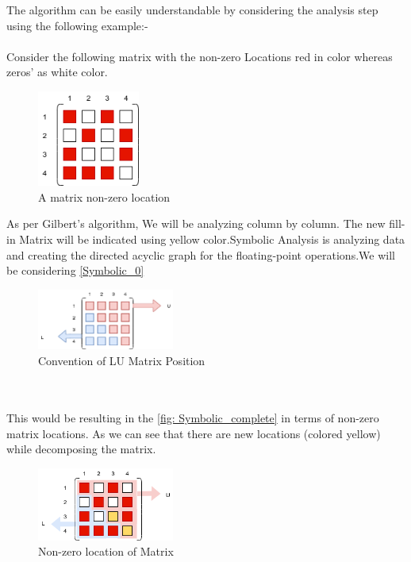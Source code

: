 The algorithm can be easily understandable by considering the analysis step using the following example:-\\\\
Consider the following matrix with the non-zero Locations red in color whereas zeros' as white color.\\
\begin{figure}[H]
    \centering
    \includegraphics[width = 0.30\textwidth]{./Scheduler/PpT-Symbolic_1.png}
    \caption{A matrix non-zero location}
    \label{fig:Symbolic_1}
\end{figure}

As per Gilbert's algorithm, We will be analyzing column by column. The new fill-in Matrix will be indicated using yellow color.Symbolic Analysis is analyzing data and creating the directed acyclic graph for the floating-point operations.We will be considering \ref{Symbolic_0}

\begin{figure}[H]
    \centering
    \includegraphics[width = 0.40\textwidth]{./Scheduler/PpT-Symbolic_0.png}
    \caption{Convention of LU Matrix Position}
    \label{fig:Symbolic_0}
\end{figure}



\\
\\
This would be resulting in the \ref{fig: Symbolic_complete} in terms of non-zero matrix locations. As we can see that there are new locations (colored yellow) while decomposing the matrix.

\begin{figure}[H]
    \centering
    \includegraphics[width = 0.40\textwidth]{./Scheduler/PpT-Symbolic_Complete.png}
    \caption{Non-zero location of Matrix}
    \label{fig:Symbolic_complete}
\end{figure}

